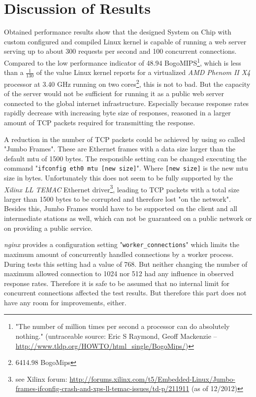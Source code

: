 \section{Discussion of Results}

Obtained performance results show that the designed System on Chip with custom configured and compiled Linux kernel is capable of running a web server serving up to about 300 requests per second and 100 concurrent connections. Compared to the low performance indicator of 48.94 BogoMIPS\footnote{"The number of million times per second a processor can do absolutely nothing." (untraceable source: Eric S Raymond, Geoff Mackenzie -- \url{http://www.tldp.org/HOWTO/html\_single/BogoMips/})}, which is less than a $\frac{1}{130}$ of the value Linux kernel reports for a virtualized \textit{AMD Phenom II X4} processor at 3.40 GHz running on two cores\footnote{6414.98 BogoMips}, this is not to bad. But the capacity of the server would not be sufficient for running it as a public web server connected to the global internet infrastructure. Especially because response rates rapidly decrease with increasing byte size of responses, reasoned in a larger amount of TCP packets required for transmitting the response.

A reduction in the number of TCP packets could be achieved by using so called "Jumbo Frames". These are Ethernet frames with a data size larger than the default \gls{mtu} of 1500 bytes. The responsible setting can be changed executing the command "\texttt{ifconfig eth0 mtu [new size]}". Where \texttt{[new size]} is the new \gls{mtu} size in bytes. Unfortunately this does not seem to be fully supported by the \textit{Xilinx LL TEMAC} Ethernet driver\footnote{see Xilinx forum: \url{http://forums.xilinx.com/t5/Embedded-Linux/Jumbo-frames-ifconfig-crash-and-xps-ll-temac-issues/td-p/211911} (as of 12/2012)}, leading to TCP packets with a total size larger than 1500 bytes to be corrupted and therefore lost "on the network". Besides this, Jumbo Frames would have to be supported on the client and all intermediate stations as well, which can not be guaranteed on a public network or on providing a public service.

\textit{nginx} provides a configuration setting "\texttt{worker\_connections}" which limits the maximum amount of concurrently handled connections by a worker process. During tests this setting had a value of 768. But neither changing the number of maximum allowed connection to 1024 nor 512 had any influence in observed response rates. Therefore it is safe to be assumed that no internal limit for concurrent connections affected the test results. But therefore this part does not have any room for improvements, either.

